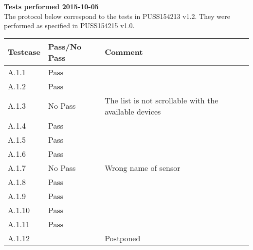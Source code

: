 \renewcommand{\testdate}{2015-10-05}
\textbf{ Tests performed \testdate} \\
The protocol below correspond to the tests in PUSS154213 v1.2. They were performed as specified in PUSS154215 v1.0.

\begin{center}
  		\begin{tabular}{| p{3cm} | p{5cm} | p{5cm} |}
    		\hline
	    	\textbf{Testcase}			& \textbf{Pass/No Pass} 	& \textbf{Comment} \\ \hline
    		A.1.1		 						& Pass 								&  \\\hline
    		A.1.2		 						& Pass 								& 				 \\	\hline
    		A.1.3		 						& No Pass 							& The list is not scrollable with the available devices		 \\	\hline
    		A.1.4		 						& Pass 								& 				 \\	\hline
    		A.1.5		 						& Pass 								& 				 \\	\hline
    		A.1.6		 						& Pass 								& 				 \\	\hline
    		A.1.7		 						& No Pass 							& Wrong name of sensor 				 \\	\hline
    		A.1.8		 						& Pass 								& 				 \\	\hline
    		A.1.9		 						& Pass 								& 				 \\	\hline
    		A.1.10	 							& Pass 								& 				 \\	\hline
    		A.1.11	 							& Pass 								& 				 \\	\hline
    		A.1.12	 							&  									& Postponed				 \\	\hline 		
 		 \end{tabular}
\end{center}
	